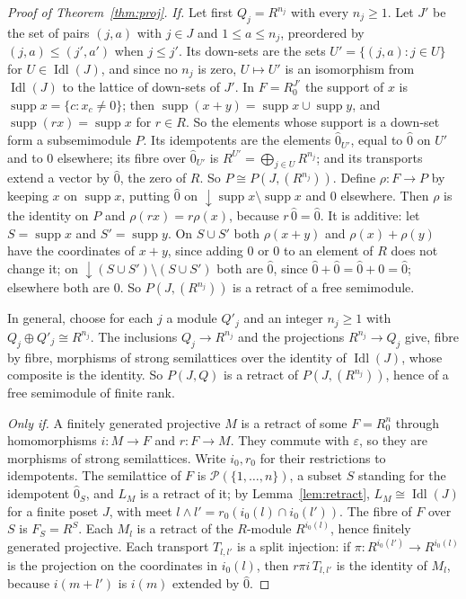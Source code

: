 \documentclass[11pt]{amsart}
\theoremstyle{remark}
\newcommand{\oz}{\widehat{0}}
\DeclareMathOperator{\Idl}{Idl}
\DeclareMathOperator{\supp}{supp}
\begin{document}
\begin{proof}[Proof of Theorem~\ref{thm:proj}]
\emph{If.} Let first $Q_j=R^{n_j}$ with every $n_j\ge1$. Let $J'$ be the set of pairs $(j,a)$ with $j\in J$ and $1\le a\le n_j$, preordered by $(j,a)\le(j',a')$ when $j\le j'$. Its down-sets are the sets $U'=\{(j,a):j\in U\}$ for $U\in\Idl(J)$, and since no $n_j$ is zero, $U\mapsto U'$ is an isomorphism from $\Idl(J)$ to the lattice of down-sets of $J'$. In $F=R_0^{J'}$ the support of $x$ is $\supp x=\{c:x_c\ne0\}$; then $\supp(x+y)=\supp x\cup\supp y$, and $\supp(rx)=\supp x$ for $r\in R$. So the elements whose support is a down-set form a subsemimodule $P$. Its idempotents are the elements $\oz_{U'}$, equal to $\oz$ on $U'$ and to $0$ elsewhere; its fibre over $\oz_{U'}$ is $R^{U'}=\bigoplus_{j\in U}R^{n_j}$; and its transports extend a vector by $\oz$, the zero of $R$. So $P\cong P(J,(R^{n_j}))$. Define $\rho\colon F\to P$ by keeping $x$ on $\supp x$, putting $\oz$ on ${\downarrow}\supp x\setminus\supp x$ and $0$ elsewhere. Then $\rho$ is the identity on $P$ and $\rho(rx)=r\rho(x)$, because $r\,\oz=\oz$. It is additive: let $S=\supp x$ and $S'=\supp y$. On $S\cup S'$ both $\rho(x+y)$ and $\rho(x)+\rho(y)$ have the coordinates of $x+y$, since adding $\oz$ or $0$ to an element of $R$ does not change it; on ${\downarrow}(S\cup S')\setminus(S\cup S')$ both are $\oz$, since $\oz+\oz=\oz+0=\oz$; elsewhere both are $0$. So $P(J,(R^{n_j}))$ is a retract of a free semimodule.

In general, choose for each $j$ a module $Q'_j$ and an integer $n_j\ge1$ with $Q_j\oplus Q'_j\cong R^{n_j}$. The inclusions $Q_j\to R^{n_j}$ and the projections $R^{n_j}\to Q_j$ give, fibre by fibre, morphisms of strong semilattices over the identity of $\Idl(J)$, whose composite is the identity. So $P(J,Q)$ is a retract of $P(J,(R^{n_j}))$, hence of a free semimodule of finite rank.

\emph{Only if.} A finitely generated projective $M$ is a retract of some $F=R_0^n$ through homomorphisms $i\colon M\to F$ and $r\colon F\to M$. They commute with $\varepsilon$, so they are morphisms of strong semilattices. Write $i_0,r_0$ for their restrictions to idempotents. The semilattice of $F$ is $\mathcal P(\{1,\dots,n\})$, a subset $S$ standing for the idempotent $\oz_S$, and $L_M$ is a retract of it; by Lemma~\ref{lem:retract}, $L_M\cong\Idl(J)$ for a finite poset $J$, with meet $l\wedge l'=r_0(i_0(l)\cap i_0(l'))$. The fibre of $F$ over $S$ is $F_S=R^S$. Each $M_l$ is a retract of the $R$-module $R^{i_0(l)}$, hence finitely generated projective. Each transport $T_{l,l'}$ is a split injection: if $\pi\colon R^{i_0(l')}\to R^{i_0(l)}$ is the projection on the coordinates in $i_0(l)$, then $r\pi i\,T_{l,l'}$ is the identity of $M_l$, because $i(m+l')$ is $i(m)$ extended by $\oz$.


\end{proof}
\end{document}
